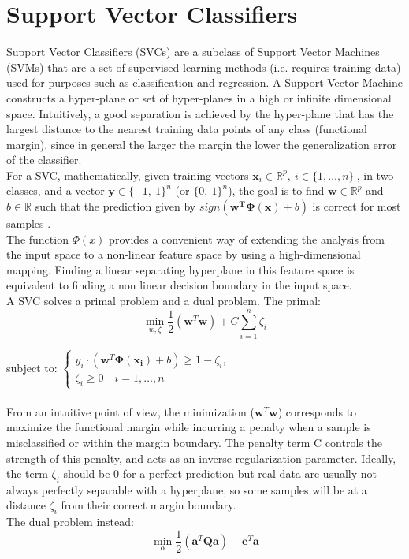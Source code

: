 \documentclass{standalone}
\begin{document}
\section{Support Vector Classifiers}

Support Vector Classifiers (SVCs) are a subclass of Support Vector Machines (SVMs) that are a set of supervised learning methods (i.e. requires training data) used for purposes such as classification and regression.
A Support Vector Machine constructs a hyper-plane or set of hyper-planes in a high or infinite dimensional space.
Intuitively, a good separation is achieved by the hyper-plane that has the largest distance to the nearest training data points of any class (functional margin), since in general the larger the margin the lower the generalization error of the classifier\cite{SVCscikit, Bishop}.\\
For a SVC, mathematically, given training vectors $ \mathbf{x}_i \in \mathbb{R}^p ,  \: i \in \{1,\dots, n\} \:$, in two classes, and a vector $\mathbf{y} \in \{ -1, \: 1 \}^n$ (or $ \{0, \: 1 \}^n$), the goal is to find $\mathbf{w} \in \mathbb{R}^p$ and $b \in \mathbb{R}$ such that the prediction given by $sign(\mathbf{w^T  \mathbf{\Phi(x)}} + b)$ is correct for most samples \cite{SVCscikit}.\\
The function $\Phi(x)$ provides a convenient way of extending the analysis from the input space to a non-linear feature space by using a high-dimensional mapping. 
Finding a linear separating hyperplane in this feature space is equivalent to finding a non linear decision boundary in the input space\cite{SVCmapping}.\\
A SVC solves a primal problem and a dual problem. 
The primal:
\begin{equation}
    \min_{w, \zeta} \frac{1}{2} (\mathbf{w}^T  \mathbf{w}) + C \sum_{i = 1}^{n} \zeta_i
\end{equation}

subject to: $\begin{cases}
    y_i \cdot (\mathbf{w}^T  \mathbf{\Phi(x_i)} + b)  \geq 1 - \zeta_i, \\
    \zeta_i \geq 0 \quad i = 1, \dots, n 
    \end{cases}$
\newline
\\
\\
From an intuitive point of view, the minimization ($\mathbf{w}^T  \mathbf{w}$) corresponds to maximize the functional margin while incurring a penalty when a sample is misclassified or within the margin boundary.
The penalty term C controls the strength of this penalty, and acts as an inverse regularization parameter\cite{SVCscikit}.
Ideally, the term $\zeta_i$ should be 0 for a perfect prediction but real data are usually not always perfectly separable with a hyperplane, so some samples will be at a distance $\zeta_i$ from their correct margin boundary.
\\
The dual problem instead:
\begin{equation}
    \min_{\alpha} \frac{1}{2} (\mathbf{a}^T \mathbf{Q} \mathbf{a}) - \mathbf{e}^T \mathbf{a}
\end{equation}
\end{document}
